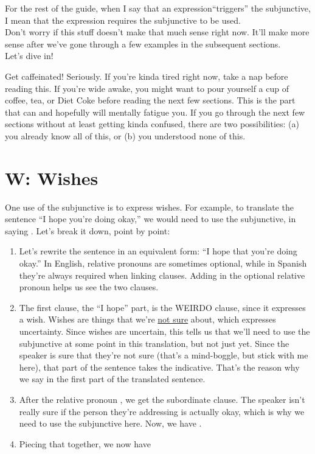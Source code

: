 For the rest of the guide, when I say that an expression``triggers'' the subjunctive, I mean that the expression requires the subjunctive to be used. \\

Don't worry if this stuff doesn't make that much sense right now. It'll make more sense after we've gone through a few examples in the subsequent sections. \\

Let's dive in! 

\begin{conf}{Get caffeinated!}
Seriously. If you're kinda tired right now, take a nap before reading this. If you're wide awake, you might want to pour yourself a cup of coffee, tea, or Diet Coke before reading the next few sections. This is the part that can and hopefully will mentally fatigue you. If you go through the next few sections without at least getting kinda confused, there are two possibilities: (a) you already know all of this, or (b) you understood none of this. 
\end{conf}
\section{W: Wishes}

One use of the subjunctive is to express wishes. For example, to translate the sentence ``I hope you're doing okay,'' we would need to use the subjunctive, in saying . Let's break it down, point by point:

\begin{enumerate}
	\item Let's rewrite the sentence in an equivalent form: ``I hope that you're doing okay.'' In English, relative pronouns are sometimes optional, while in Spanish they're always required when linking clauses. Adding in the optional relative pronoun helps us see the two clauses.
	\item The first clause, the ``I hope'' part, is the WEIRDO clause, since it expresses a wish. Wishes are things that we're \underline{not sure} about, which expresses uncertainty. Since wishes are uncertain, this tells us that we'll need to use the subjunctive at some point in this translation, but not just yet. Since the speaker is sure that they're not sure (that's a mind-boggle, but stick with me here), that part of the sentence takes the indicative. That's the reason why we say  in the first part of the translated sentence. 
	\item After the relative pronoun , we get the subordinate clause. The speaker isn't really sure if the person they're addressing is actually okay, which is why we need to use the subjunctive here. Now, we have .
	\item Piecing that together, we now have 
\end{enumerate}


